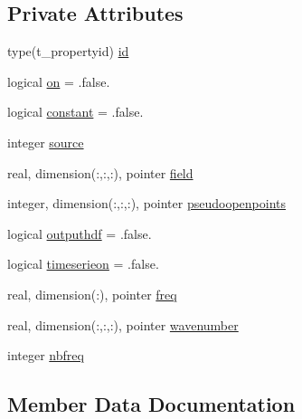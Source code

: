 \subsection*{Private Attributes}
\begin{DoxyCompactItemize}
\item 
type(t\+\_\+propertyid) \mbox{\hyperlink{structmodulewaves_1_1t__waveproperty3d_a24ca83a6a86addafe66457810ac726ac}{id}}
\item 
logical \mbox{\hyperlink{structmodulewaves_1_1t__waveproperty3d_a1c38a4c189f0e93786a62d66eb3e4d84}{on}} = .false.
\item 
logical \mbox{\hyperlink{structmodulewaves_1_1t__waveproperty3d_a5a262a465d734b2773e99a95febfe933}{constant}} = .false.
\item 
integer \mbox{\hyperlink{structmodulewaves_1_1t__waveproperty3d_a0525d756ea450774e0a9684399bdcdd0}{source}}
\item 
real, dimension(\+:,\+:,\+:), pointer \mbox{\hyperlink{structmodulewaves_1_1t__waveproperty3d_a2e1bda582f6ade5ab4d1272ca17ce5ab}{field}}
\item 
integer, dimension(\+:,\+:,\+:), pointer \mbox{\hyperlink{structmodulewaves_1_1t__waveproperty3d_a70595a1b3aaa0cf8dcd323462dfbd3c4}{pseudoopenpoints}}
\item 
logical \mbox{\hyperlink{structmodulewaves_1_1t__waveproperty3d_a67835e84c0e8126f366ecb8bb340ea04}{outputhdf}} = .false.
\item 
logical \mbox{\hyperlink{structmodulewaves_1_1t__waveproperty3d_abec27b24b5c658bfd54cf89613093011}{timeserieon}} = .false.
\item 
real, dimension(\+:), pointer \mbox{\hyperlink{structmodulewaves_1_1t__waveproperty3d_a23ec14c8c2c1f784ace06f50059e147a}{freq}}
\item 
real, dimension(\+:,\+:,\+:), pointer \mbox{\hyperlink{structmodulewaves_1_1t__waveproperty3d_a4ebc4ba0733621aea1bf0a7eb6150061}{wavenumber}}
\item 
integer \mbox{\hyperlink{structmodulewaves_1_1t__waveproperty3d_a6e9ceb9bcf16c01b48976a698b793c71}{nbfreq}}
\end{DoxyCompactItemize}


\subsection{Member Data Documentation}
\mbox{\label{structmodulewaves_1_1t__waveproperty3d_a5a262a465d734b2773e99a95febfe933}} 

